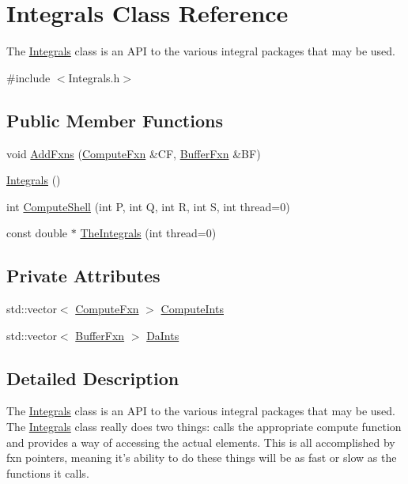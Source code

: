 \hypertarget{classJKBuilder_1_1Integrals}{
\section{Integrals Class Reference}
\label{classJKBuilder_1_1Integrals}
}


The \hyperlink{classJKBuilder_1_1Integrals}{Integrals} class is an API to the various integral packages that may be used.  


{\ttfamily \#include $<$Integrals.h$>$}\subsection*{Public Member Functions}
\begin{DoxyCompactItemize}
\item 
void \hyperlink{classJKBuilder_1_1Integrals_a192b23625f0ca29472adb24ea0167d04}{AddFxns} (\hyperlink{Integrals_8h_ac8a8046e90f302a56e8d49058926be33}{ComputeFxn} \&CF, \hyperlink{Integrals_8h_ab945cefec686042cf6ebb998aa068552}{BufferFxn} \&BF)
\item 
\hyperlink{classJKBuilder_1_1Integrals_ad62b2f3d89ff3b7777582513a89381f0}{Integrals} ()
\item 
int \hyperlink{classJKBuilder_1_1Integrals_ac5087342e58e3fd449a58e82ea7e4b9c}{ComputeShell} (int P, int Q, int R, int S, int thread=0)
\item 
const double $\ast$ \hyperlink{classJKBuilder_1_1Integrals_ad0720a0de5aa5cbe34ac5f4b80754ee7}{TheIntegrals} (int thread=0)
\end{DoxyCompactItemize}
\subsection*{Private Attributes}
\begin{DoxyCompactItemize}
\item 
std::vector$<$ \hyperlink{Integrals_8h_ac8a8046e90f302a56e8d49058926be33}{ComputeFxn} $>$ \hyperlink{classJKBuilder_1_1Integrals_a968679304a6d15dd63858873608113b5}{ComputeInts}
\item 
std::vector$<$ \hyperlink{Integrals_8h_ab945cefec686042cf6ebb998aa068552}{BufferFxn} $>$ \hyperlink{classJKBuilder_1_1Integrals_a877ca0c4fd4342f3d3ca7078e65fbfeb}{DaInts}
\end{DoxyCompactItemize}


\subsection{Detailed Description}
The \hyperlink{classJKBuilder_1_1Integrals}{Integrals} class is an API to the various integral packages that may be used. The \hyperlink{classJKBuilder_1_1Integrals}{Integrals} class really does two things: calls the appropriate compute function and provides a way of accessing the actual elements. This is all accomplished by fxn pointers, meaning it's ability to do these things will be as fast or slow as the functions it calls. 

